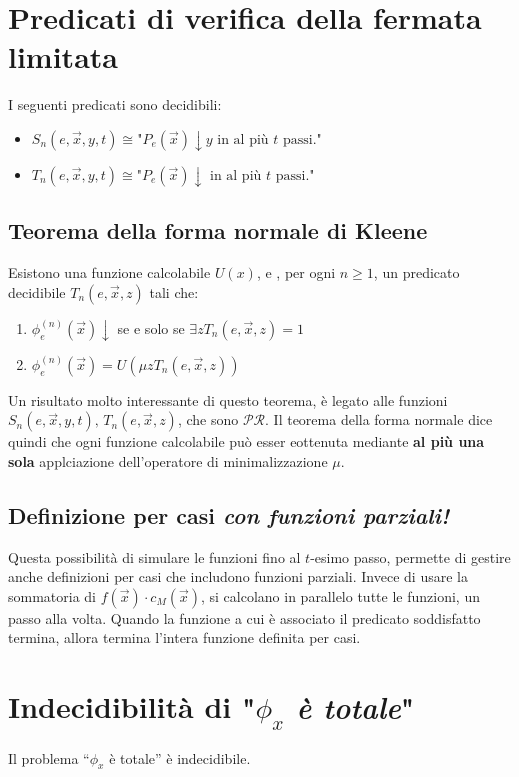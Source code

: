 	\section{Predicati di verifica della fermata limitata}
	I seguenti predicati sono decidibili:
	\begin{itemize}
		\item $S_n(e, \vec{x}, y, t) \cong \text{"$P_e(\vec{x})\downarrow y$ in al più $t$ passi."}$
		\item $T_n(e, \vec{x}, y, t) \cong \text{"$P_e(\vec{x})\downarrow$ in al più $t$ passi."}$
	\end{itemize}
	
	\subsection{Teorema della forma normale di Kleene}
	Esistono una funzione calcolabile $U(x)$, e , per ogni $n \geq 1$, un predicato decidibile $T_n(e, \vec{x}, z)$ tali che:
	\begin{enumerate}
		\item $\phi_e^{(n)}(\vec{x})\downarrow$ se e solo se $\exists z T_n(e, \vec{x}, z) = 1$
		\item $\phi_e^{(n)}(\vec{x}) = U(\mu zT_n(e, \vec{x}, z))$
	\end{enumerate}
	Un risultato molto interessante di questo teorema, è legato alle funzioni $S_n(e, \vec{x}, y, t), \, T_n(e, \vec{x}, z)$, che sono $\mathcal{PR}$. Il teorema della forma normale dice quindi che ogni funzione calcolabile può esser eottenuta mediante \textbf{al più una sola} applciazione dell'operatore di minimalizzazione $\mu$.
	
	
	\subsection{Definizione per casi \textit{con funzioni parziali!}}
	Questa possibilità di simulare le funzioni fino al $t$-esimo passo, permette di gestire anche definizioni per casi che includono funzioni parziali. Invece di usare la sommatoria di $f(\vec{x}) \cdot c_M(\vec{x})$, si calcolano in parallelo tutte le funzioni, un passo alla volta. Quando la funzione a cui è associato il predicato soddisfatto termina, allora termina l'intera funzione definita per casi.
	
	\section{Indecidibilità di "\textit{$\phi_x$ è totale}"}
	Il problema ``$\phi_x$ è totale'' è indecidibile. 
